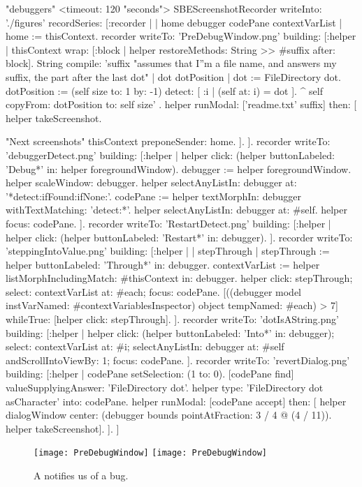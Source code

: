 \documentclass[a4paper,10pt,twoside]{book}
\begin{document}
\begin{ExecuteSmalltalkScript}
"debuggers"
<timeout: 120 "seconds">
SBEScreenshotRecorder writeInto: './figures' recordSeries: [:recorder |
	| home debugger codePane contextVarList |
	home := thisContext.
	recorder writeTo: 'PreDebugWindow.png' building: [:helper |
		thisContext wrap: [:block | helper restoreMethods: {String >> #suffix} after: block].
		String compile: 'suffix
	"assumes that I''m a file name, and answers my suffix, the part after the last dot"
	| dot dotPosition |
	dot := FileDirectory dot.
	dotPosition := (self size to: 1 by: -1) detect: [ :i | (self at: i) = dot ].
	^ self copyFrom: dotPosition to: self size'
.
		helper
			runModal: ['readme.txt' suffix]
			then: [
				helper takeScreenshot.

				"Next screenshots"
				thisContext preponeSender: home.
			].
	].
	recorder writeTo: 'debuggerDetect.png' building: [:helper |
		helper click: (helper buttonLabeled: 'Debug*' in: helper foregroundWindow).
		debugger := helper foregroundWindow.
		helper scaleWindow: debugger.
		helper selectAnyListIn: debugger at: '*detect:ifFound:ifNone:'.
		codePane := helper textMorphIn: debugger withTextMatching: 'detect:*'.
		helper selectAnyListIn: debugger at: #self.
		helper focus: codePane.
	].
	recorder writeTo: 'RestartDetect.png' building: [:helper |
		helper click: (helper buttonLabeled: 'Restart*' in: debugger).
	].
	recorder writeTo: 'steppingIntoValue.png' building: [:helper |
		| stepThrough |
		stepThrough := helper buttonLabeled: 'Through*' in: debugger.
		contextVarList := helper listMorphIncludingMatch: #thisContext in: debugger.
		helper
			click: stepThrough;
			select: contextVarList at: #each;
			focus: codePane.
		[((debugger model instVarNamed: #contextVariablesInspector) object tempNamed: #each) > 7]
			whileTrue: [helper click: stepThrough].
	].
	recorder writeTo: 'dotIsAString.png' building: [:helper |
		helper
			click: (helper buttonLabeled: 'Into*' in: debugger);
			select: contextVarList at: #i;
			selectAnyListIn: debugger at: #self andScrollIntoViewBy: 1;
			focus: codePane.
	].
	recorder writeTo: 'revertDialog.png' building: [:helper |
		codePane setSelection: (1 to: 0).
		[codePane find]
			valueSupplyingAnswer: 'FileDirectory dot'.
		helper type: 'FileDirectory dot asCharacter' into: codePane.
		helper
			runModal: [codePane accept]
			then: [
				helper dialogWindow center: (debugger bounds pointAtFraction: 3 / 4 @ (4 / 11)).
				helper takeScreenshot].
	].
]
\end{ExecuteSmalltalkScript}
\begin{figure}[btp]
	\begin{center}
	\ifluluelse
		{\texttt{[image: PreDebugWindow]}}
		{\texttt{[image: PreDebugWindow]}}
	\end{center}
	\caption{A  notifies us of a bug.}
	\label{fig:PreDebugWindow}
\end{figure}
\end{document}
